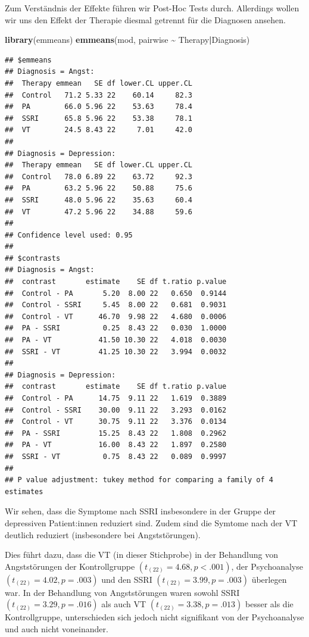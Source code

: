 \documentclass[
]{book}
\newenvironment{Shaded}{\begin{snugshade}}{\end{snugshade}}
\newcommand{\FunctionTok}[1]{\textcolor[rgb]{0.13,0.29,0.53}{\textbf{#1}}}
\newcommand{\NormalTok}[1]{#1}
\newcommand{\SpecialCharTok}[1]{\textcolor[rgb]{0.81,0.36,0.00}{\textbf{#1}}}
\begin{document}
Zum Verständnis der Effekte führen wir Post-Hoc Tests durch. Allerdings wollen wir uns den Effekt der Therapie diesmal getrennt für die Diagnosen ansehen.

\begin{Shaded}
\begin{Highlighting}[]
\FunctionTok{library}\NormalTok{(emmeans)}
\FunctionTok{emmeans}\NormalTok{(mod, pairwise }\SpecialCharTok{\textasciitilde{}}\NormalTok{ Therapy}\SpecialCharTok{|}\NormalTok{Diagnosis)}
\end{Highlighting}
\end{Shaded}

\begin{verbatim}
## $emmeans
## Diagnosis = Angst:
##  Therapy emmean   SE df lower.CL upper.CL
##  Control   71.2 5.33 22    60.14     82.3
##  PA        66.0 5.96 22    53.63     78.4
##  SSRI      65.8 5.96 22    53.38     78.1
##  VT        24.5 8.43 22     7.01     42.0
## 
## Diagnosis = Depression:
##  Therapy emmean   SE df lower.CL upper.CL
##  Control   78.0 6.89 22    63.72     92.3
##  PA        63.2 5.96 22    50.88     75.6
##  SSRI      48.0 5.96 22    35.63     60.4
##  VT        47.2 5.96 22    34.88     59.6
## 
## Confidence level used: 0.95 
## 
## $contrasts
## Diagnosis = Angst:
##  contrast       estimate    SE df t.ratio p.value
##  Control - PA       5.20  8.00 22   0.650  0.9144
##  Control - SSRI     5.45  8.00 22   0.681  0.9031
##  Control - VT      46.70  9.98 22   4.680  0.0006
##  PA - SSRI          0.25  8.43 22   0.030  1.0000
##  PA - VT           41.50 10.30 22   4.018  0.0030
##  SSRI - VT         41.25 10.30 22   3.994  0.0032
## 
## Diagnosis = Depression:
##  contrast       estimate    SE df t.ratio p.value
##  Control - PA      14.75  9.11 22   1.619  0.3889
##  Control - SSRI    30.00  9.11 22   3.293  0.0162
##  Control - VT      30.75  9.11 22   3.376  0.0134
##  PA - SSRI         15.25  8.43 22   1.808  0.2962
##  PA - VT           16.00  8.43 22   1.897  0.2580
##  SSRI - VT          0.75  8.43 22   0.089  0.9997
## 
## P value adjustment: tukey method for comparing a family of 4 estimates
\end{verbatim}

Wir sehen, dass die Symptome nach SSRI insbesondere in der Gruppe der depressiven Patient:innen reduziert sind. Zudem sind die Symtome nach der VT deutlich reduziert (insbesondere bei Angststörungen).

Dies führt dazu, dass die VT (in dieser Stichprobe) in der Behandlung von Angststörungen der Kontrollgruppe \((t_{(22)}=4.68, p<.001)\), der Psychoanalyse \((t_{(22)}=4.02, p=.003)\) und den SSRI \((t_{(22)}=3.99, p=.003)\) überlegen war. In der Behandlung von Angststörungen waren sowohl SSRI \((t_{(22)}=3.29, p=.016)\) als auch VT \((t_{(22)}=3.38, p=.013)\) besser als die Kontrollgruppe, unterschieden sich jedoch nicht signifikant von der Psychoanalyse und auch nicht voneinander.
\end{document}

